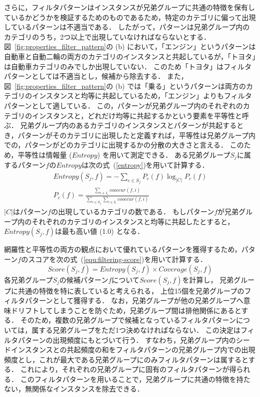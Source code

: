 \documentclass[japanese]{jnlp_1.4}
\begin{document}
さらに，フィルタパターンはインスタンスが兄弟グループに共通の特徴を保有しているかどうかを検証するためのものであるため，特定のカテゴリに偏って出現しているパターンは不適当である．
したがって，パターンは兄弟グループ内のカテゴリのうち，2つ以上で出現していなければならないとする．
図~\ref{fig:properties_filter_pattern}の (b) において，「エンジン」というパターンは自動車と自動二輪の両方のカテゴリのインスタンスと共起しているが，「トヨタ」は自動車カテゴリのみでしか出現していない．
このため「トヨタ」はフィルタパターンとしては不適当とし，候補から除去する．
また，図~\ref{fig:properties_filter_pattern}の (b) では「乗る」というパターンは両方のカテゴリのインスタンスと均等に共起しているため，「エンジン」よりもフィルタパターンとして適している．
この，パターンが兄弟グループ内のそれぞれのカテゴリのインスタンスと，どれだけ均等に共起するかという要素を平等性と呼ぶ．
兄弟グループ内のあるカテゴリのインスタンスとパターンが共起するとき，パターンがそのカテゴリに出現したと定義すれば，平等性は兄弟グループ内での，パターンがどのカテゴリに出現するかの分散の大きさと言える．
このため，平等性は情報量 ($\mathit{Entropy}$) を用いて測定できる．
ある兄弟グループ$S_{j}$に属するパターン$f$の$Entropy$は次の式~(\ref{entropy})を用いて計算する．
\begin{gather}
\mathit{Entropy}(S_{j}, f) = - \sum_{c \in S_{j}} P_c(f) \log_{|C|} P_c(f)
	\label{entropy}\\
P_c(f) = \frac{\sum_{i \in I_{c}}\mathit{cooccur}(f, i)}{\sum_{c \in S_{j}}\sum_{i \in I_{c}}\mathit{cooccur}(f, i)}
\end{gather}
$|C|$はパターン$f$の出現しているカテゴリの数である．
もしパターン$f$が兄弟グループ内のそれぞれのカテゴリのインスタンスと均等に共起したとすると，$\mathit{Entropy}(S_{j}, f)$は最も高い値 (1.0) となる．

網羅性と平等性の両方の観点において優れているパターンを獲得するため，パターン$f$のスコアを次の式~(\ref{equ:filtering-score})を用いて計算する．
\begin{equation}
\mathit{Score}(S_{j}, f) = \mathit{Entropy}(S_{j}, f) \times Coverage(S_{j}, f) 
	\label{equ:filtering-score}
\end{equation}
各兄弟グループ$S_{j}$の候補パターン$f$について$\mathit{Score}(S_{j}, f)$を計算し，
兄弟グループに共通の特徴を特に表していると考えられる，
上位15個を兄弟グループのフィルタパターンとして獲得する．
なお，兄弟グループが他の兄弟グループへ意味ドリフトしてしまうことを防ぐため，兄弟グループ間は排他関係にあるとする．
そのため，複数の兄弟グループで候補となっているフィルタパターンについては，属する兄弟グループをただ1つ決めなければならない．
この決定はフィルタパターンの出現頻度にもとづいて行う．
すなわち，兄弟グループ内のシードインスタンスとの共起頻度の和をフィルタパターンの兄弟グループ内での出現頻度とし，これが最大である兄弟グループにのみフィルタパターンは属するとする．
これにより，それぞれの兄弟グループに固有のフィルタパターンが得られる．
このフィルタパターンを用いることで，兄弟グループに共通の特徴を持たない，無関係なインスタンスを除去できる．
\end{document}
